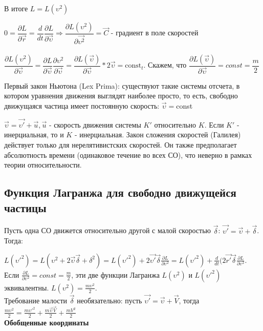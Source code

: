 \documentclass[a4paper,12pt]{report}
\newcommand{\pf}[2]{ 
\dfrac{\partial #1}{\partial #2} 
}
\newcommand{\df}[2]{ 
\dfrac{d #1}{d #2} 
}
\begin{document}
В итоге $L=L(\upsilon^2)$

$0=\pf{L}{\vec{r}}=\df{}{t} \pf{L}{\vec{\upsilon}} \Rightarrow \pf{L(\upsilon^2)}{\vec{\upsilon^2}} =\vec{C}$ - градиент в поле скоростей\\
\\

$\pf{L(\upsilon^2)}{\vec{\upsilon}}=\pf{L}{\vec{\upsilon}} \pf{\upsilon^2}{\vec{\upsilon}}=\pf{L(\vec{\upsilon})}{\vec{\upsilon}}*2\vec{\upsilon}=\text{const}_t$. Скажем, что $\pf{L(\vec{\upsilon})}{\vec{\upsilon}}=const=\dfrac{m}{2}$

Первый закон Ньютона (Lex Prima): существуют такие системы отсчета, в котором уравнения движения выглядят наиболее просто, то есть, свободно движущаяся частица имеет постоянную скорость: $\vec{\upsilon}=$const

$\vec{\upsilon}=\vec{\upsilon ' }+\vec{u}, \vec{u} $ - скорость движения системы $K'$ относительно $K$. Если $K'$ - инерциальная, то и $K$ - инерциальная. Закон сложения скоростей (Галилея) действует только для нерелятивистских скоростей. Он также предполагает абсолютность времени (одинаковое течение во всех СО), что неверно в рамках теории относительности.

\subsection{Функция Лагранжа для свободно движущейся частицы}
Пусть одна СО движется относительно другой с малой скоростью $\vec{\delta}$: $\vec{\upsilon'}=\vec{\upsilon}+\vec{\delta}$. Тогда:

$L({\upsilon'}^2)=L(\upsilon^2+2\vec{\upsilon}\vec{\delta}+\delta^2)=L({\upsilon'}^2)+2\vec{\upsilon'}\vec{\delta} \frac {\partial{L}}{\partial{\upsilon^2}}=L({\upsilon'}^2)+\frac{d}{dt}(2\vec{r'}\vec{\delta} \frac {\partial{L}}{\partial{\upsilon^2}}$.\\

Если $\frac {\partial{L}}{\partial{\upsilon^2}}=const=\frac{m}{2}$, эти две функции Лагранжа $L(\upsilon^2)$ и $L({\upsilon'}^2)$ эквивалентны. $L(\upsilon^2)=\frac{m\upsilon^2}{2}$.\\

Требование малости $\vec{\delta}$ необязательно: пусть $\vec{{\upsilon'}}=\vec{\upsilon}+\vec{V}$, тогда $\frac{m\upsilon^2}{2}=\frac{m{\upsilon'}^2}{2}+\frac{m\vec{\upsilon}\vec{V}}{2}+\frac{mV^2}{2}$\\

\textbf{Обобщенные координаты}
\end{document}
